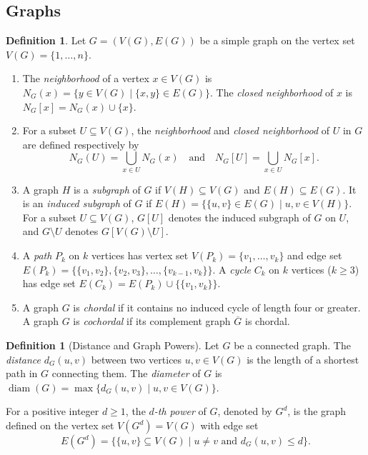 \documentclass[12pt]{amsart}
\numberwithin{equation}{section}
\theoremstyle{definition}
\newtheorem{defn}[thm]{Definition}
\begin{document}
\subsection{Graphs}

\begin{defn}
Let $G = (V(G), E(G))$ be a simple graph on the vertex set $V(G) = \{1, \ldots, n\}$.
\begin{enumerate}
    \item The \emph{neighborhood} of a vertex $x \in V(G)$ is $N_G(x) = \{y \in V(G) \mid \{x, y\} \in E(G)\}$. The \emph{closed neighborhood} of $x$ is $N_G[x] = N_G(x) \cup \{x\}$.
    \item For a subset $U \subseteq V(G)$, the \emph{neighborhood} and \emph{closed neighborhood} of $U$ in $G$ are defined respectively by 
    \[
    N_G(U) = \bigcup_{x \in U} N_G(x) \quad \text{and} \quad N_G[U] = \bigcup_{x \in U} N_G[x].
    \]
    \item A graph $H$ is a \emph{subgraph} of $G$ if $V(H) \subseteq V(G)$ and $E(H) \subseteq E(G)$. It is an \emph{induced subgraph} of $G$ if $E(H) = \{\{u, v\} \in E(G) \mid u, v \in V(H)\}$. For a subset $U \subseteq V(G)$, $G[U]$ denotes the induced subgraph of $G$ on $U$, and $G \setminus U$ denotes $G[V(G) \setminus U]$.
    \item A \emph{path} $P_k$ on $k$ vertices has vertex set $V(P_k) = \{v_1, \ldots, v_k\}$ and edge set $E(P_k) = \{\{v_1, v_2\}, \{v_2, v_3\}, \ldots, \{v_{k-1}, v_k\}\}$. A \emph{cycle} $C_k$ on $k$ vertices ($k \ge 3$) has edge set $E(C_k) = E(P_k) \cup \{\{v_1, v_k\}\}$.
    \item A graph $G$ is \emph{chordal} if it contains no induced cycle of length four or greater. A graph $G$ is \emph{cochordal} if its complement graph $\overline{G}$ is chordal.
\end{enumerate}
\end{defn}


\begin{defn}[Distance and Graph Powers]
Let $G$ be a connected graph. The \emph{distance} $d_G(u, v)$ between two vertices $u, v \in V(G)$ is the length of a shortest path in $G$ connecting them. The \emph{diameter} of $G$ is $\operatorname{diam}(G) = \max\{d_G(u, v) \mid u, v \in V(G)\}$.

For a positive integer $d \ge 1$, the \emph{$d$-th power} of $G$, denoted by $G^d$, is the graph defined on the vertex set $V(G^d) = V(G)$ with edge set
\[
E(G^d) = \{\{u, v\} \subseteq V(G) \mid u \neq v \text{ and } d_G(u, v) \le d\}.
\]
\end{defn}
\end{document}
